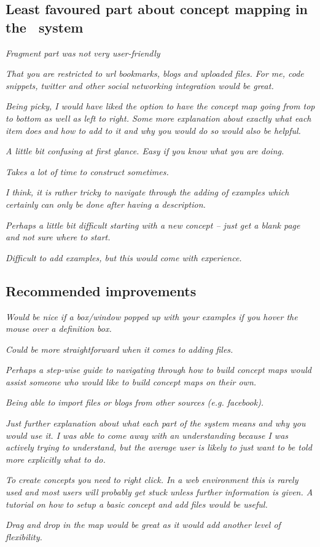 \subsection[Least favoured part about concept mapping]{Least favoured part about
concept mapping in the \ep~system}

\textit{Fragment part was not very user-friendly}

\textit{That you are restricted to url bookmarks, blogs and uploaded files. For
me, code snippets, twitter and other social networking integration would be
great.}

\textit{Being picky, I would have liked the option to have the concept map going
from top to bottom as well as left to right. Some more explanation about exactly
what each item does and how to add to it and why you would do so would also be
helpful.}

\textit{A little bit confusing at first glance. Easy if you know what you are
doing.}

\textit{Takes a lot of time to construct sometimes.}

\textit{I think, it is rather tricky to navigate through the adding of examples
which certainly can only be done after having a description.}

\textit{Perhaps a little bit difficult starting with a new concept -- just get a
blank page and not sure where to start.}

\textit{Difficult to add examples, but this would come with experience.}


\subsection{Recommended improvements}

\textit{Would be nice if a box/window popped up with your examples if you hover
the mouse over a definition box.}

\textit{Could be more straightforward when it comes to adding files.}

\textit{Perhaps a step-wise guide to navigating through how to build concept
maps would assist someone who would like to build concept maps on their own.}

\textit{Being able to import files or blogs from other sources (e.g. facebook).}

\textit{Just further explanation about what each part of the system means and
why you would use it. I was able to come away with an understanding because I
was actively trying to understand, but the average user is likely to just want
to be told more explicitly what to do. }

\textit{To create concepts you need to right click. In a web environment this is
rarely used and most users will probably get stuck unless further information is
given. A tutorial on how to setup a basic concept and add files would be useful.}

\textit{Drag and drop in the map would be great as it would add another level
of flexibility.}